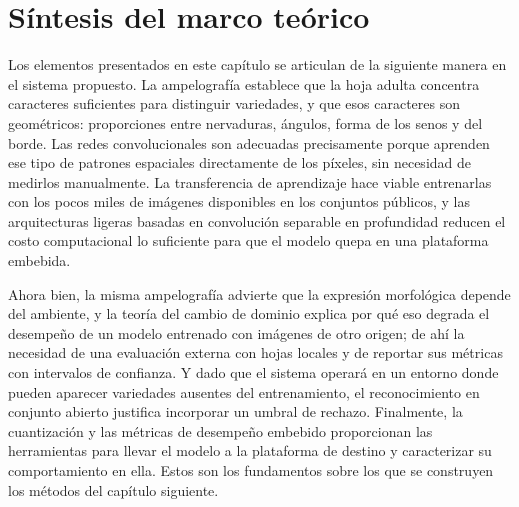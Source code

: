 \section{Síntesis del marco teórico}

Los elementos presentados en este capítulo se articulan de la siguiente
manera en el sistema propuesto. La ampelografía establece que la hoja adulta
concentra caracteres suficientes para distinguir variedades, y que esos
caracteres son geométricos: proporciones entre nervaduras, ángulos, forma de
los senos y del borde. Las redes convolucionales son adecuadas precisamente
porque aprenden ese tipo de patrones espaciales directamente de los píxeles,
sin necesidad de medirlos manualmente. La transferencia de aprendizaje hace
viable entrenarlas con los pocos miles de imágenes disponibles en los
conjuntos públicos, y las arquitecturas ligeras basadas en convolución
separable en profundidad reducen el costo computacional lo suficiente para
que el modelo quepa en una plataforma embebida.

Ahora bien, la misma ampelografía advierte que la expresión morfológica
depende del ambiente, y la teoría del cambio de dominio explica por qué eso
degrada el desempeño de un modelo entrenado con imágenes de otro origen;
de ahí la necesidad de una evaluación externa con hojas locales y de
reportar sus métricas con intervalos de confianza. Y dado que el sistema
operará en un entorno donde pueden aparecer variedades ausentes del
entrenamiento, el reconocimiento en conjunto abierto justifica incorporar un
umbral de rechazo. Finalmente, la cuantización y las métricas de desempeño
embebido proporcionan las herramientas para llevar el modelo a la plataforma
de destino y caracterizar su comportamiento en ella. Estos son los
fundamentos sobre los que se construyen los métodos del capítulo siguiente.
